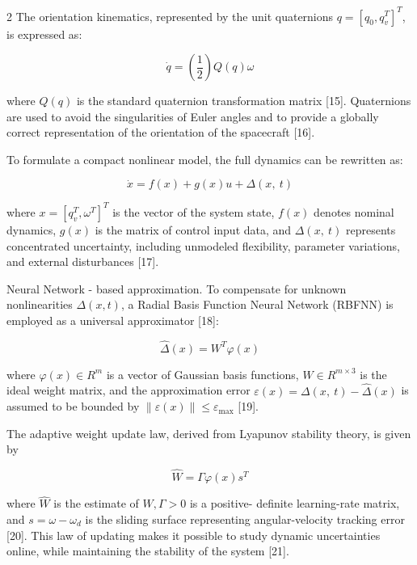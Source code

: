 \begin{multicols}{2}
The orientation kinematics, represented by the unit quaternions
\(q = \left\lbrack q_{0},q_{v}^{Τ} \right\rbrack^{Τ}\), is expressed as:

\begin{equation}
\dot{q} = \left( \frac{1}{2} \right)Q(q)\omega
\end{equation}

where \(Q(q)\) is the standard quaternion transformation matrix
{[}15{]}. Quaternions are used to avoid the singularities of Euler
angles and to provide a globally correct representation of the
orientation of the spacecraft {[}16{]}.

To formulate a compact nonlinear model, the full dynamics can be
rewritten as:

\begin{equation}
\dot{x} = f(x) + g(x)u + \Delta (x,\ t)
\end{equation}

where \(x = \left\lbrack q_{v}^{T},\omega^{Τ} \right\rbrack^{Τ}\) is the
vector of the system state, \(f(x)\) denotes nominal dynamics, \(g(x)\)
is the matrix of control input data, and \(\Delta (x,\ t)\)
represents concentrated uncertainty, including unmodeled flexibility,
parameter variations, and external disturbances {[}17{]}.

Neural Network - based approximation. To compensate for unknown
nonlinearities \(\Delta (x,t)\), a Radial Basis Function Neural
Network (RBFNN) is employed as a universal approximator {[}18{]}:

\begin{equation}
\widehat{\Delta }(x) = W^{Τ}\varphi(x)
\end{equation}

where \(\varphi(x) \in R^{m}\) is a vector of Gaussian basis functions,
\(W \in R^{m \times 3}\) is the ideal weight matrix, and the
approximation error
\(\varepsilon(x) = \Delta (x,\ t) - \widehat{\Delta }(x)\)
is assumed to be bounded by
\(\left\| \varepsilon(x) \right\| \leq \varepsilon_{\max}\) {[}19{]}.

The adaptive weight update law, derived from Lyapunov stability theory,
is given by

\begin{equation}
\widehat{W} = \Gamma\varphi(x)s^{Τ}
\end{equation}

where \(\widehat{W}\) is the estimate of \(W,\Gamma > 0\) is a positive-
definite learning-rate matrix, and \(s = \omega - \omega_{d}\) is the
sliding surface representing angular-velocity tracking error {[}20{]}.
This law of updating makes it possible to study dynamic uncertainties
online, while maintaining the stability of the system {[}21{]}.


\end{multicols}
